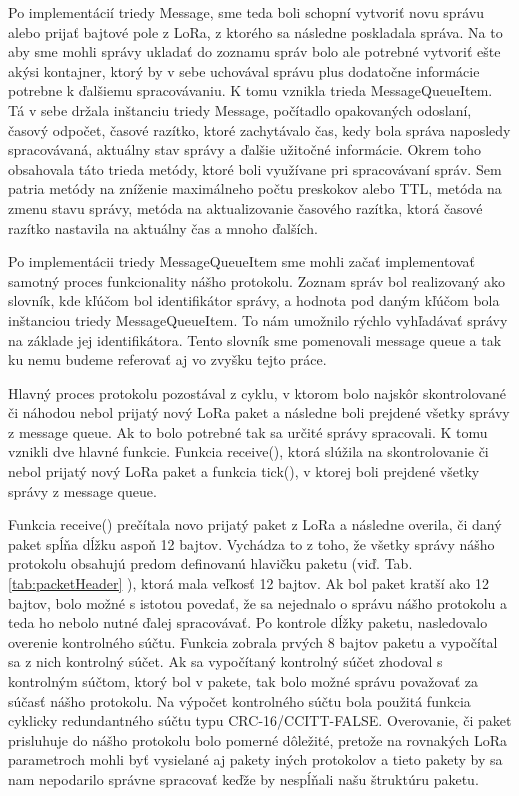 \documentclass[slovak,master]{diploma}
\begin{document}
Po implementácií triedy Message, sme teda boli schopní vytvoriť novu správu alebo prijať bajtové pole z LoRa, z ktorého sa následne poskladala správa. Na to aby sme 
mohli správy ukladať do zoznamu správ bolo ale potrebné vytvoriť ešte akýsi kontajner, ktorý by v sebe uchovával správu plus dodatočne informácie potrebne k ďalšiemu spracovávaniu.
K tomu vznikla trieda MessageQueueItem. Tá v sebe držala inštanciu triedy Message, počítadlo opakovaných odoslaní, časový odpočet, časové razítko, ktoré zachytávalo čas, kedy bola 
správa naposledy spracovávaná, aktuálny stav správy a ďalšie užitočné informácie. Okrem toho obsahovala táto trieda metódy, ktoré boli využívane pri spracovávaní správ. Sem patria metódy na zníženie maximálneho počtu preskokov alebo 
TTL, metóda na zmenu stavu správy, metóda na aktualizovanie časového razítka, ktorá časové razítko nastavila na aktuálny čas a mnoho ďalších.

Po implementácii triedy MessageQueueItem sme mohli začať implementovať samotný proces funkcionality nášho protokolu. Zoznam správ bol realizovaný ako slovník, 
kde kľúčom bol identifikátor správy, a hodnota pod daným kľúčom bola inštanciou triedy MessageQueueItem. To nám umožnilo rýchlo vyhľadávať správy na základe jej identifikátora. 
Tento slovník sme pomenovali message queue a tak ku nemu budeme referovať aj vo zvyšku tejto práce.

Hlavný proces protokolu pozostával z cyklu, v ktorom bolo najskôr skontrolované či náhodou nebol prijatý nový LoRa paket a následne boli prejdené všetky správy z message queue. Ak to bolo 
potrebné tak sa určité správy spracovali. K tomu vznikli dve hlavné funkcie. Funkcia receive(), ktorá slúžila na skontrolovanie či nebol prijatý nový LoRa paket a funkcia tick(), v ktorej boli prejdené všetky správy z message queue.

Funkcia receive() prečítala novo prijatý paket z LoRa a následne overila, či daný paket spĺňa dĺžku aspoň 12 bajtov. Vychádza to z toho, že všetky správy nášho protokolu obsahujú predom definovanú 
hlavičku paketu (viď. Tab. \ref{tab:packetHeader} ), ktorá mala veľkosť 12 bajtov. Ak bol paket kratší ako 12 bajtov, bolo možné s istotou povedať, že sa nejednalo o správu nášho protokolu a teda ho nebolo 
nutné ďalej spracovávať. Po kontrole dĺžky paketu, nasledovalo overenie kontrolného súčtu. Funkcia zobrala prvých 8 bajtov paketu a vypočítal sa z nich kontrolný súčet. 
Ak sa vypočítaný kontrolný súčet zhodoval s kontrolným súčtom, ktorý bol v pakete, tak bolo možné správu považovať za 
súčasť nášho protokolu. Na výpočet kontrolného súčtu bola použitá funkcia cyklicky redundantného súčtu typu CRC-16/CCITT-FALSE. Overovanie, či paket prisluhuje do nášho protokolu bolo pomerné dôležité, 
pretože na rovnakých LoRa parametroch mohli byť vysielané aj pakety iných protokolov a tieto pakety by sa nam nepodarilo správne spracovať keďže by nespĺňali našu štruktúru paketu.
\end{document}
